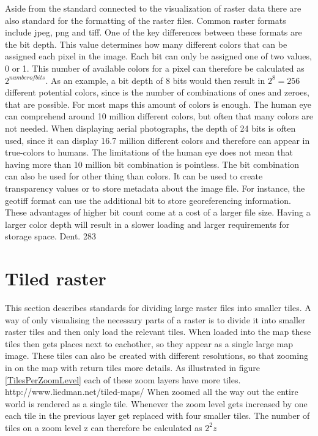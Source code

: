 Aside from the standard connected to the visualization of raster data there are also standard for the formatting of the raster files. Common raster formats include jpeg, png and tiff. One of the key differences between these formats are the bit depth. This value determines how many different colors that can be assigned each pixel in the image. Each bit can only be assigned one of two values, 0 or 1. This number of available colors for a pixel can therefore be calculated as $2^{number of bits}$. As an example, a bit depth of 8 bits would then result in $2^8 = 256$ different potential colors, since is the number of combinations of ones and zeroes, that are possible. For most maps this amount of colors is enough. The human eye can comprehend around 10 million different colors, but often that many colors are not needed. When displaying aerial photographs, the depth of 24 bits is often used, since it can display 16.7 million different colors and therefore can appear in true-colors to humans.
The limitations of the human eye does not mean that having more than 10 million bit combination is pointless. The bit combination can also be used for other thing than colors. It can be used to create transparency values or to store metadata about the image file. For instance, the geotiff format can use the additional bit to store georeferencing information.
These advantages of higher bit count come at a cost of a larger file size. Having a larger color depth will result in a slower loading and larger requirements for storage space.
Dent. 283 
\section{Tiled raster}
This section describes standards for dividing large raster files into smaller tiles. 
A way of only visualising the necessary parts of a raster is to divide it into smaller raster tiles and then only load the relevant tiles. When loaded into the map these tiles then gets places next to eachother, so they appear as a single large map image. These tiles can also be created with different resolutions, so that zooming in on the map with return tiles more details.  As illustrated in figure \ref{TilesPerZoomLevel} each of these zoom layers have more tiles.
 http://www.liedman.net/tiled-maps/
When zoomed all the way out the entire world is rendered as a single tile. Whenever the zoom level gets increased by one each tile in the previous layer get replaced with four smaller tiles. The number of tiles on a zoom level z can therefore be calculated as $2^2z$

